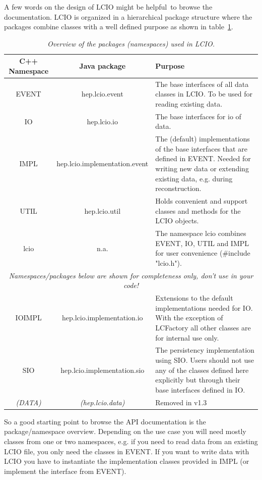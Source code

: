 \documentclass[twoside]{article}
\newcommand{\captionstyle}[1]{\textit{\small{#1}}}
\begin{document}
A few words on the design of LCIO might be helpful\ to browse the documentation.
LCIO is organized in a hierarchical package structure where the packages combine classes
with a well defined purpose as shown in table~\ref{tab_pkg}.  
\begin{table}[h]
\begin{center}
\begin{tabular}{|c|c|p{6cm}|}
\hline
\rule[-5mm]{0mm}{10mm} C++ Namespace  &  Java package    &  Purpose \\ \hline \hline

 EVENT  &  hep.lcio.event   & The base interfaces of all data classes in LCIO. To be used for reading existing
 data.\\ \hline
 IO  &  hep.lcio.io   &  The base interfaces for io of data.\\ \hline
 IMPL  &  hep.lcio.implementation.event   & The (default) implementations of
 the base interfaces that are defined in EVENT. Needed for writing new data or extending existing data, e.g.
 during reconstruction. \\ \hline
 UTIL  &  hep.lcio.util   & Holds convenient and support classes and methods for the LCIO objects.
 \\ \hline
lcio  &   n.a. & The namespace lcio combines EVENT, IO, UTIL and IMPL for user convenience
(\#include "lcio.h"). \\ \hline
   \multicolumn{3}{|c|}{\textit{\small Namespaces/packages below are shown for completeness only, don't use 
 in your code!}}         \\ \hline
 IOIMPL  &  hep.lcio.implementation.io   &  Extensions to the default implementations
 needed for IO. With the exception of LCFactory all other classes are for internal use only.\\ \hline
 SIO  &  hep.lcio.implementation.sio   & The persistency implementation using SIO.
 Users should not use any of the classes defined here explicitly but through their
 base interfaces defined in IO. \\ \hline
 \textit{\small (DATA)  } &   \textit{\small (hep.lcio.data)}   & Removed in v1.3  \\ \hline

\end{tabular}
\end{center}
\caption{\captionstyle{ Overview of the packages (namespaces) used in LCIO.}}
\label{tab_pkg}
\end{table}
So a good starting point to browse the API documentation is the package/namespace overview.
Depending on the use case you will need mostly classes from one or two namespaces, e.g. if you need 
to read data from an existing LCIO file, you only need the classes in EVENT.
If you want to write data with LCIO you have to instantiate the implementation classes provided in 
IMPL (or implement the interface from EVENT).
\end{document}
